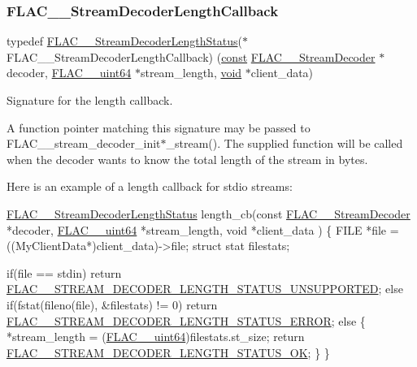 \subsubsection{\texorpdfstring{F\+L\+A\+C\+\_\+\+\_\+\+Stream\+Decoder\+Length\+Callback}{FLAC\_\_StreamDecoderLengthCallback}}
{\footnotesize\ttfamily typedef \hyperlink{group__flac__stream__decoder_gad5860157c2bb34501b8b9370472d727a}{F\+L\+A\+C\+\_\+\+\_\+\+Stream\+Decoder\+Length\+Status}($\ast$ F\+L\+A\+C\+\_\+\+\_\+\+Stream\+Decoder\+Length\+Callback) (\hyperlink{zconf_8h_a2c212835823e3c54a8ab6d95c652660e}{const} \hyperlink{struct_f_l_a_c_____stream_decoder}{F\+L\+A\+C\+\_\+\+\_\+\+Stream\+Decoder} $\ast$decoder, \hyperlink{ordinals_8h_aa78c8c70a3eb8a58af7436f278acde8e}{F\+L\+A\+C\+\_\+\+\_\+uint64} $\ast$stream\+\_\+length, \hyperlink{png_8h_ac9c84fa68bbad002983e35ce3663c686}{void} $\ast$client\+\_\+data)}

Signature for the length callback.

A function pointer matching this signature may be passed to F\+L\+A\+C\+\_\+\+\_\+stream\+\_\+decoder\+\_\+init$\ast$\+\_\+stream(). The supplied function will be called when the decoder wants to know the total length of the stream in bytes.

Here is an example of a length callback for stdio streams\+: 
\begin{DoxyCode}
\hyperlink{group__flac__stream__decoder_gad5860157c2bb34501b8b9370472d727a}{FLAC\_\_StreamDecoderLengthStatus} length\_cb(\textcolor{keyword}{const} 
      \hyperlink{struct_f_l_a_c_____stream_decoder}{FLAC\_\_StreamDecoder} *decoder, \hyperlink{ordinals_8h_aa78c8c70a3eb8a58af7436f278acde8e}{FLAC\_\_uint64} *stream\_length, \textcolor{keywordtype}{void} *client\_data
      )
\{
  FILE *file = ((MyClientData*)client\_data)->file;
  \textcolor{keyword}{struct }stat filestats;

  \textcolor{keywordflow}{if}(file == stdin)
    \textcolor{keywordflow}{return} \hyperlink{group__flac__stream__decoder_ggad5860157c2bb34501b8b9370472d727aae35949f46f887e6d826fe0fe4b2a32c1}{FLAC\_\_STREAM\_DECODER\_LENGTH\_STATUS\_UNSUPPORTED};
  \textcolor{keywordflow}{else} \textcolor{keywordflow}{if}(fstat(fileno(file), &filestats) != 0)
    \textcolor{keywordflow}{return} \hyperlink{group__flac__stream__decoder_ggad5860157c2bb34501b8b9370472d727aab000e31c0c20c0d19df4f2203b01ea23}{FLAC\_\_STREAM\_DECODER\_LENGTH\_STATUS\_ERROR};
  \textcolor{keywordflow}{else} \{
    *stream\_length = (\hyperlink{ordinals_8h_aa78c8c70a3eb8a58af7436f278acde8e}{FLAC\_\_uint64})filestats.st\_size;
    \textcolor{keywordflow}{return} \hyperlink{group__flac__stream__decoder_ggad5860157c2bb34501b8b9370472d727aaef01bfcdc3099686e106d8f88397653d}{FLAC\_\_STREAM\_DECODER\_LENGTH\_STATUS\_OK};
  \}
\}
\end{DoxyCode}


